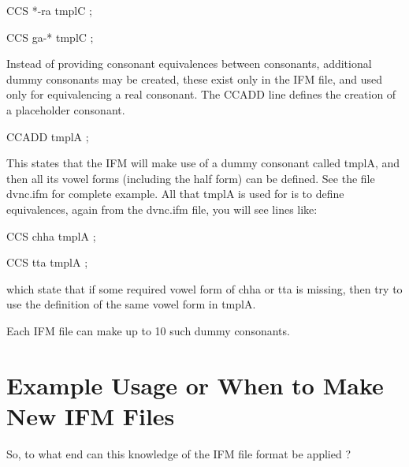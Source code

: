 \documentclass[11pt]{article}
\begin{document}
CCS *-ra tmplC ;

CCS ga-* tmplC ;

Instead of providing consonant equivalences between consonants,
additional dummy consonants may be created, these exist only in the IFM
file, and used only for equivalencing a real consonant.
The CCADD line defines the creation of a placeholder consonant.

CCADD tmplA ;

This states that the IFM will make use of a dummy consonant called tmplA,
and then all its vowel forms (including the half form) can be defined.
See the file dvnc.ifm for complete example.
All that tmplA is used for is to define equivalences, again from the
dvnc.ifm file, you will see lines like:

CCS chha tmplA ;

CCS tta tmplA ;

which state that if some required vowel form of chha or tta is missing,
then try to use the definition of the same vowel form in tmplA.

Each IFM file can make up to 10 such dummy consonants.

\section{Example Usage or When to Make New IFM Files}

So, to what end  can this knowledge  of the IFM file format be applied ?
\end{document}
